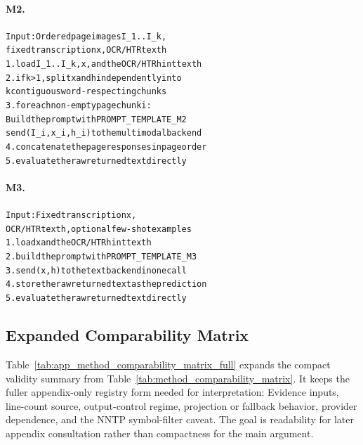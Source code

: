 \paragraph{M2.}
{\footnotesize
\begin{alltt}
Input: Ordered page images I_1..I_k,
       fixed transcription x, OCR/HTR text h
1. load I_1..I_k, x, and the OCR/HTR hint text h
2. if k > 1, split x and h independently into
   k contiguous word-respecting chunks
3. for each non-empty page chunk i:
     Build the prompt with PROMPT_TEMPLATE_M2
     send (I_i, x_i, h_i) to the multimodal backend
4. concatenate the page responses in page order
5. evaluate the raw returned text directly
\end{alltt}
}

\paragraph{M3.}
{\footnotesize
\begin{alltt}
Input: Fixed transcription x,
       OCR/HTR text h, optional few-shot examples
1. load x and the OCR/HTR hint text h
2. build the prompt with PROMPT_TEMPLATE_M3
3. send (x, h) to the text backend in one call
4. store the raw returned text as the prediction
5. evaluate the raw returned text directly
\end{alltt}
}

\subsection{Expanded Comparability Matrix}
\label{sec:appendix_method_comparability}

Table~\ref{tab:app_method_comparability_matrix_full} expands the compact validity summary from Table~\ref{tab:method_comparability_matrix}. It keeps the fuller appendix-only registry form needed for interpretation: Evidence inputs, line-count source, output-control regime, projection or fallback behavior, provider dependence, and the NNTP symbol-filter caveat. The goal is readability for later appendix consultation rather than compactness for the main argument.

